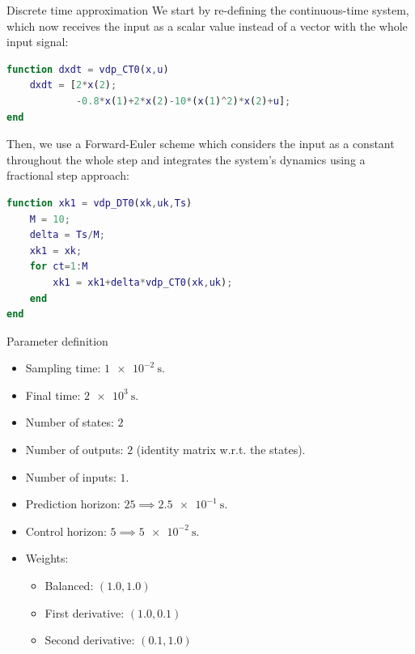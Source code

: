 \documentclass{beamer}
\begin{document}
\begin{frame}[fragile]{Discrete time approximation}
    We start by re-defining the continuous-time system, which now receives the input as a scalar value instead of a vector with the whole input signal:

    \begin{lstlisting}[language=Matlab,basicstyle=\tiny]
function dxdt = vdp_CT0(x,u)
    dxdt = [2*x(2);
            -0.8*x(1)+2*x(2)-10*(x(1)^2)*x(2)+u];
end
    \end{lstlisting}

    Then, we use a Forward-Euler scheme which considers the input as a constant throughout the whole step and integrates the system's dynamics using a fractional step approach:

    \begin{lstlisting}[language=Matlab,basicstyle=\tiny]
function xk1 = vdp_DT0(xk,uk,Ts)
    M = 10;
    delta = Ts/M;
    xk1 = xk;
    for ct=1:M
        xk1 = xk1+delta*vdp_CT0(xk,uk);
    end
end
    \end{lstlisting}
\end{frame}

\begin{frame}{Parameter definition}
    \begin{itemize}
        \item Sampling time: $\SI{1e-2}{\second}$.
        \item Final time: $\SI{2e3}{\second}$.
        \item Number of states: $2$
        \item Number of outputs: $2$ (identity matrix w.r.t. the states).
        \item Number of inputs: $1$.
        \item Prediction horizon: $25 \implies \SI{2.5e-1}{\second}$.
        \item Control horizon: $5 \implies \SI{5e-2}{\second}$.
        \item Weights:
            \begin{itemize}
                \item Balanced: $\left(1.0,1.0\right)$
                \item First derivative: $\left(1.0,0.1\right)$
                \item Second derivative: $\left(0.1,1.0\right)$
            \end{itemize}
    \end{itemize}
\end{frame}
\end{document}
